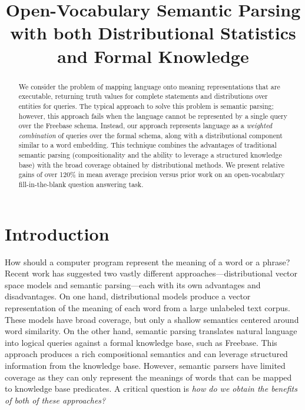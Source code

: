 \documentclass[11pt]{article}
\title{Open-Vocabulary Semantic Parsing\\with both Distributional
Statistics and Formal Knowledge}
\author{}%
\date{}
\begin{document}
\maketitle

\begin{abstract}

  We consider the problem of mapping language onto meaning representations that
  are executable, returning truth values for complete statements and
  distributions over entities for queries.  The typical approach to solve this
  problem is semantic parsing; however, this approach fails when the language
  cannot be represented by a single query over the Freebase schema.  Instead,
  our approach represents language as a \emph{weighted combination} of queries
  over the formal schema, along with a distributional component similar to a
  word embedding.  This technique combines the advantages of traditional
  semantic parsing (compositionality and the ability to leverage a structured
  knowledge base) with the broad coverage obtained by distributional methods.
  We present relative gains of over 120\% in mean average precision versus
  prior work on an open-vocabulary fill-in-the-blank question answering task.

\end{abstract}

\section{Introduction}

How should a computer program represent the meaning of a word or a phrase?
Recent work has suggested two vastly different approaches---distributional
vector space models and semantic parsing---each with its own advantages and
disadvantages. On one hand, distributional models produce a vector
representation of the meaning of each word from a large unlabeled text corpus.
These models have broad coverage, but only a shallow semantics centered around
word similarity. On the other hand, semantic parsing translates natural
language into logical queries against a formal knowledge base, such as
Freebase. This approach produces a rich compositional semantics and can
leverage structured information from the knowledge base. However, semantic
parsers have limited coverage as they can only represent the meanings of words
that can be mapped to knowledge base predicates. A critical question is
\emph{how do we obtain the benefits of both of these approaches?}
\end{document}

